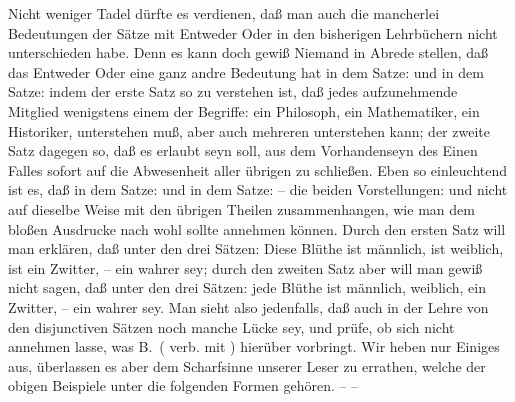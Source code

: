 Nicht weniger Tadel dürfte es verdienen, daß man auch die mancherlei Bedeutungen der Sätze mit Entweder Oder in den bisherigen Lehrbüchern nicht unterschieden habe. Denn es kann doch gewiß Niemand in Abrede stellen, daß das Entweder Oder eine ganz andre Bedeutung hat in dem Satze:  und in dem Satze:  indem der erste Satz so zu verstehen ist, daß jedes aufzunehmende Mitglied wenigstens einem der Begriffe: ein Philosoph, ein Mathematiker, ein Historiker, unterstehen muß, aber auch mehreren unterstehen kann; der zweite Satz dagegen so, daß es erlaubt seyn soll, aus dem Vorhandenseyn des Einen Falles sofort auf die Abwesenheit aller übrigen zu schließen. Eben so einleuchtend ist es, daß in dem Satze:  und in dem Satze:  -- die beiden Vorstellungen:  und  nicht auf dieselbe Weise mit den übrigen Theilen zusammenhangen, wie man dem bloßen Ausdrucke nach wohl sollte annehmen können. Durch den ersten Satz will man erklären, daß unter den drei Sätzen: Diese Blüthe ist männlich, ist weiblich, ist ein Zwitter, -- ein wahrer sey; durch den zweiten Satz aber will man gewiß nicht sagen, daß unter den drei Sätzen: jede Blüthe ist männlich, weiblich, ein Zwitter, -- ein wahrer sey. Man sieht also  jedenfalls, daß auch in der Lehre von den disjunctiven Sätzen noch manche Lücke sey, und prüfe, ob sich nicht annehmen lasse, was B.\ ( verb. mit ) hierüber vorbringt. Wir heben nur Einiges aus, überlassen es aber dem Scharfsinne unserer Leser zu errathen, welche der obigen Beispiele unter die folgenden Formen gehören.   --  --  \par
